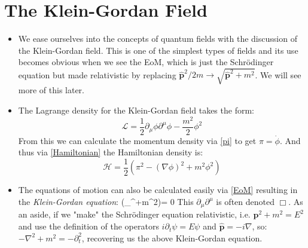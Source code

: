 \documentclass[11pt]{article}
\renewenvironment{flalign}{\vspace{-3mm}\empheq[box=\tcbhighmath]{align}}{\endempheq}
\numberwithin{equation}{section}
\begin{document}
\section{The Klein-Gordan Field}
\begin{itemize}
  \item We ease ourselves into the concepts of quantum fields with the discussion of the Klein-Gordan field. This is one of the simplest types of fields and its use becomes obvious when we see the EoM, which is just the Schr\"odinger equation but made relativistic by replacing $\hat{\textbf{p}}^2/2m \rightarrow \sqrt{\hat{\textbf{p}}^2 + m^2}$. We will see more of this later.

     \item The Lagrange density for the Klein-Gordan field takes the form:
     \begin{equation}
       \label{KG field}
       \mathcal{L} = \frac{1}{2}\partial_{\mu} \phi \partial^{\mu}\phi -\frac{m^2}{2}\phi^2
     \end{equation}   
From this we can calculate the momentum density via \ref{pi} to get $\pi = \dot{\phi}$. And thus via \ref{Hamiltonian} the Hamiltonian density is:
\[
  \mathcal{H} = \frac{1}{2}\left(\pi^2 -(\nabla\phi)^2+m^2\phi^2\right) 
\]
\item The equations of motion can also be calculated easily via \ref{EoM} resulting in the \emph{Klein-Gordan equation}:
\begin{flalign}
\label{KG eq}
  (\partial_{\mu}\partial^{\mu}+m^2)\phi  = 0
\end{flalign} 
This $\partial_{\mu}\partial^{\mu}$ is often denoted $\Box$. As an aside, if we "make" the Schr\"odinger equation relativistic, i.e. $\textbf{p}^2 + m^2 = E^2$ and use the definition of the operators $ i\partial_t\psi= E\psi $ and $\hat{\textbf{p}} = -i\nabla$, so:  $-\nabla^2 + m^2 = -\partial^2_t$, recovering us the above Klein-Gordan equation.  
\end{itemize}
\end{document}
